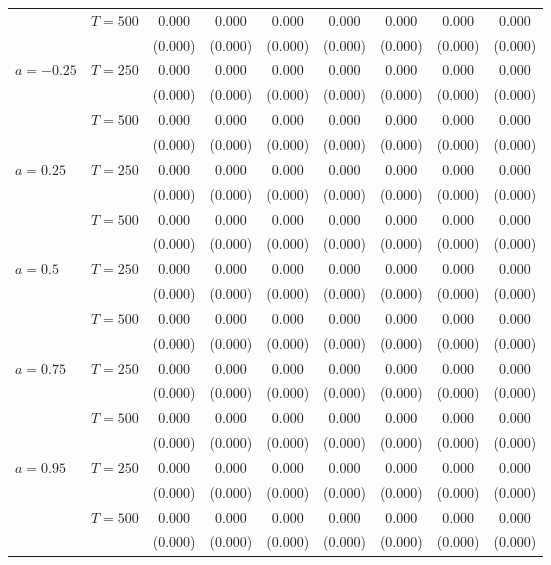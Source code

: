 \begin{table}[H]
{\begin{tabularx}{\textwidth}{L{1.25} L{1.25} C{0.925} C{0.925} C{0.925} C{0.925} C{0.925} C{0.925} C{0.925}}
            & $T=500$ & 0.000   & 0.000   & 0.000   & 0.000   & 0.000   & 0.000   & 0.000   \\
            &         & (0.000) & (0.000) & (0.000) & (0.000) & (0.000) & (0.000) & (0.000) \\[0.1cm]
$a = -0.25$ & $T=250$ & 0.000   & 0.000   & 0.000   & 0.000   & 0.000   & 0.000   & 0.000   \\
            &         & (0.000) & (0.000) & (0.000) & (0.000) & (0.000) & (0.000) & (0.000) \\
            & $T=500$ & 0.000   & 0.000   & 0.000   & 0.000   & 0.000   & 0.000   & 0.000   \\
            &         & (0.000) & (0.000) & (0.000) & (0.000) & (0.000) & (0.000) & (0.000) \\[0.1cm]
$a = 0.25$  & $T=250$ & 0.000   & 0.000   & 0.000   & 0.000   & 0.000   & 0.000   & 0.000   \\
            &         & (0.000) & (0.000) & (0.000) & (0.000) & (0.000) & (0.000) & (0.000) \\
            & $T=500$ & 0.000   & 0.000   & 0.000   & 0.000   & 0.000   & 0.000   & 0.000   \\
            &         & (0.000) & (0.000) & (0.000) & (0.000) & (0.000) & (0.000) & (0.000) \\[0.1cm]
$a = 0.5$   & $T=250$ & 0.000   & 0.000   & 0.000   & 0.000   & 0.000   & 0.000   & 0.000   \\
            &         & (0.000) & (0.000) & (0.000) & (0.000) & (0.000) & (0.000) & (0.000) \\
            & $T=500$ & 0.000   & 0.000   & 0.000   & 0.000   & 0.000   & 0.000   & 0.000   \\
            &         & (0.000) & (0.000) & (0.000) & (0.000) & (0.000) & (0.000) & (0.000) \\[0.1cm]
$a = 0.75$  & $T=250$ & 0.000   & 0.000   & 0.000   & 0.000   & 0.000   & 0.000   & 0.000   \\
            &         & (0.000) & (0.000) & (0.000) & (0.000) & (0.000) & (0.000) & (0.000) \\
            & $T=500$ & 0.000   & 0.000   & 0.000   & 0.000   & 0.000   & 0.000   & 0.000   \\
            &         & (0.000) & (0.000) & (0.000) & (0.000) & (0.000) & (0.000) & (0.000) \\[0.1cm]
$a = 0.95$  & $T=250$ & 0.000   & 0.000   & 0.000   & 0.000   & 0.000   & 0.000   & 0.000   \\
            &         & (0.000) & (0.000) & (0.000) & (0.000) & (0.000) & (0.000) & (0.000) \\
            & $T=500$ & 0.000   & 0.000   & 0.000   & 0.000   & 0.000   & 0.000   & 0.000   \\
            &         & (0.000) & (0.000) & (0.000) & (0.000) & (0.000) & (0.000) & (0.000) \\[0.1cm]
\bottomrule
\end{tabularx}}
\end{table}

